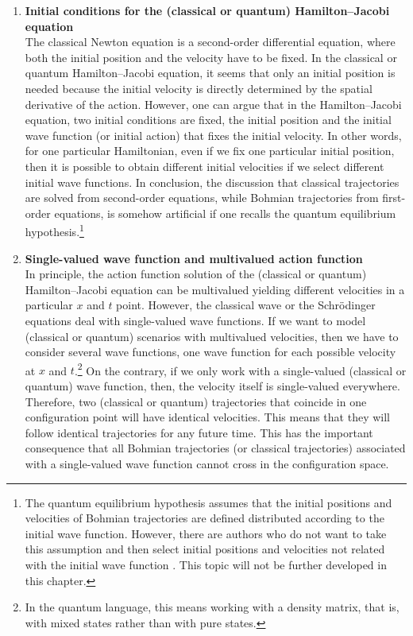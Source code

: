\documentclass[onecolumn,nofootinbib, secnumarabic, amsmath, nobibnotes,11pt,aps,pra]{revtex4-1}
\begin{document}
\begin{enumerate}
\begin{enumerate}
\item \textbf{Initial conditions for the (classical or quantum)  Hamilton--Jacobi equation} \\ The classical Newton equation is a second-order differential equation, where both the initial position and the velocity have to be fixed. In the classical or quantum Hamilton--Jacobi equation, it seems that only an initial position is needed because the initial velocity is directly determined by the spatial derivative of the action. However, one can argue that in the Hamilton--Jacobi equation, two initial conditions are fixed, the initial position and the initial wave function (or initial action) that fixes the initial velocity. In other words, for one particular Hamiltonian, even if we fix one particular initial position, then it is possible to obtain different initial velocities if we select different initial wave functions. In conclusion, the discussion that classical trajectories are solved from second-order equations, while Bohmian trajectories from first-order equations, is somehow artificial if one recalls the quantum equilibrium hypothesis.\footnote{The quantum equilibrium hypothesis assumes that the initial positions and velocities of Bohmian trajectories are defined distributed according to the initial wave function. However, there are authors who do not want to take this assumption and then select initial positions and velocities not related with the initial wave function \cite{om.extra2,om.extra9,om.Valentini2006,om.nonequilibrium}. This topic will not be further developed in this chapter.}

\item \textbf{Single-valued wave function and multivalued action function} \\ In principle, the action function solution of the (classical or quantum) Hamilton--Jacobi equation can be multivalued yielding different velocities in a particular $x$ and $t$ point. However, the classical wave or the Schr\"odinger equations deal with single-valued wave functions. If we want to model (classical or quantum) scenarios with multivalued velocities, then we have to consider several wave functions, one wave function for each possible velocity at $x$ and $t$.\footnote{In the quantum language, this means working with a density matrix, that is, with mixed states rather than with pure states.} On the contrary, if we only work with a single-valued (classical or quantum) wave function, then, the velocity itself is single-valued everywhere. Therefore, two (classical or quantum) trajectories that coincide in one configuration point will have identical velocities. This means that they will follow identical trajectories for any future time. This has the important consequence that all Bohmian trajectories (or classical trajectories) associated with a single-valued wave function cannot cross in the configuration space.
\end{enumerate}

\end{enumerate}
\end{document}
